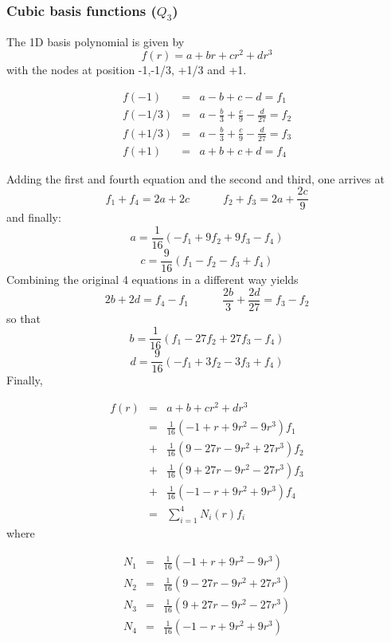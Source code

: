 \subsubsection{Cubic basis functions ($Q_3$) \label{sec:bf3}}

The 1D basis polynomial is given by
\[
f(r)=a+br+cr^2+dr^3
\]
with the nodes at position -1,-1/3, +1/3 and +1.

\begin{eqnarray}
f(-1)   &=& a-b+c-d = f_1 \nonumber\\
f(-1/3) &=& a-\frac{b}{3}+\frac{c}{9}-\frac{d}{27} = f_2 \nonumber\\
f(+1/3) &=& a-\frac{b}{3}+\frac{c}{9}-\frac{d}{27} = f_3 \nonumber\\
f(+1)   &=& a+b+c+d = f_4 \nonumber
\end{eqnarray}

Adding the first and fourth equation and the second and third, one arrives at
\[
f_1+f_4 = 2a+2c \quad\quad\quad f_2+f_3=2a+\frac{2c}{9}
\]
and finally:
\[
a=\frac{1}{16} \left( -f_1 + 9f_2 + 9f_3 - f_4  \right)
\]
\[
c=\frac{9}{16}\left(f_1-f_2-f_3+f_4\right)
\]
Combining the original 4 equations in a different way yields
\[
2b+2d=f_4-f_1 
\quad\quad\quad
\frac{2b}{3} + \frac{2d}{27} = f_3-f_2
\]
so that
\[
b=\frac{1}{16} \left( f_1 - 27f_2 + 27f_3 -f_4   \right)
\]
\[
d=\frac{9}{16} \left( -f_1 + 3f_2 - 3f_3 + f_4 \right)
\]
Finally,

\begin{eqnarray}
f(r) 
&=& a+b+cr^2+dr^3 \nonumber\\
&=& \frac{1}{16} (-1+  r +9r^2 - 9r^3 )f_1 \nonumber\\ 
&+& \frac{1}{16} ( 9-27r -9r^2 +27r^3 )f_2 \nonumber\\ 
&+& \frac{1}{16} ( 9+27r -9r^2 -27r^3 )f_3 \nonumber\\ 
&+& \frac{1}{16} (-1-  r +9r^2 + 9r^3 )f_4 \nonumber\\ 
&=& \sum_{i=1}^4 N_i(r) f_i \nonumber
\end{eqnarray}
where
\begin{mdframed}[backgroundcolor=blue!5]
\begin{eqnarray}
N_1&=& \frac{1}{16} (-1+  r+9r^2- 9r^3 ) \nonumber\\ 
N_2&=& \frac{1}{16} ( 9-27r-9r^2+27r^3 ) \nonumber\\ 
N_3&=& \frac{1}{16} ( 9+27r-9r^2-27r^3 ) \nonumber\\ 
N_4&=& \frac{1}{16} (-1-  r+9r^2+ 9r^3 ) \nonumber
\end{eqnarray}
\end{mdframed}

